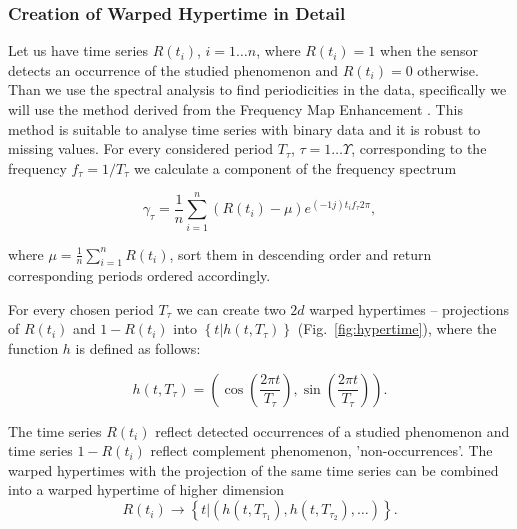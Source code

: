 \subsubsection{Creation of Warped Hypertime in Detail}


Let us have time series $R\left(t_{i}\right)$, $i = 1 \ldots n$, where $R\left(t_{i}\right) = 1$ when the sensor detects an occurrence of the studied phenomenon and $R\left(t_{i}\right) = 0$ otherwise.
Than we use the spectral analysis to find periodicities in the data, specifically we will use the method derived from the Frequency Map Enhancement \cite{krajnik2017fremen}. 
This method is suitable to analyse time series with binary data and it is robust to missing values.
For every considered period $T_{\tau}$, $\tau = 1 \ldots \Upsilon$, corresponding to the frequency ${f}_{\tau} = 1 / T_{\tau}$ we calculate a component of the frequency spectrum

\begin{equation}\label{eq:components}
\gamma_{\tau} = \frac{1}{n} \sum_{i = 1}^{n} (R\left(t_{i}\right)-\mu)e^{(-1j)t_{i}{f}_{\tau}2\pi},
\end{equation}

\noindent where $\mu = \frac{1}{n} \sum_{i = 1}^{n} R\left(t_{i}\right)$, sort them in descending order and return corresponding periods ordered accordingly.


For every chosen period $T_{\tau}$ we can create two $2d$ warped hypertimes -- projections of $R\left(t_{i}\right)$ and $1 - R\left(t_{i}\right)$ into $\left\{t|h(t, T_{\tau})\right\}$ (Fig.~\ref{fig:hypertime}), where the function $h$ is defined as follows:

\begin{equation}\label{eq:hyperime}
    h(t, T_{\tau}) = \left(\cos{\left(\frac{2\pi t}{T_{\tau}}\right)}, \sin{\left(\frac{2\pi t}{T_{\tau}}\right)}\right).
\end{equation}


\noindent The time series $R\left(t_{i}\right)$ reflect detected occurrences of a studied phenomenon and time series $1 - R\left(t_{i}\right)$ reflect complement phenomenon, 'non-occurrences'.
The warped hypertimes with the projection of the same time series can be combined into a warped hypertime of  higher dimension 
\begin{equation}\label{eq:multihyper}
R\left(t_{i}\right) \rightarrow \left\{t|\left(h(t, T_{\tau_1}), h(t, T_{\tau_2}), \ldots\right)\right\}.
\end{equation} 

